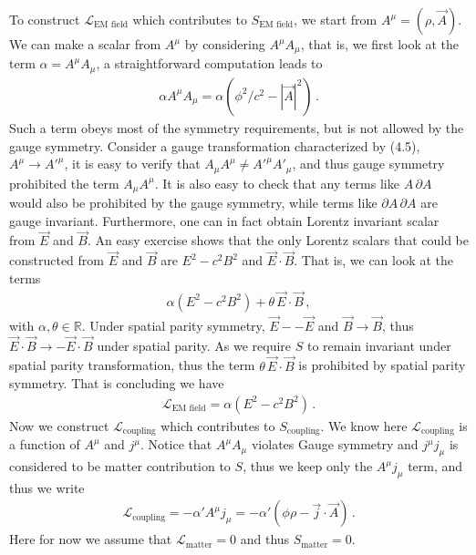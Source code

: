 \documentclass[11pt, onesided]{book}
\theoremstyle{break}
\theoremstyle{break}
\newcommand{\R}{\mathbb{R}}
\newcommand{\pd}{\partial}
\begin{document}
To construct $\mathcal{L}_{\text{EM field}}$ which contributes to $S_{\text{EM field}}$, we start from $A^\mu = (\rho, \vec{A})$. We can make a scalar from $A^\mu$ by considering $A^\mu A_\mu$, that is, we first look at the term $\alpha = A^\mu A_\mu$, a straightforward computation leads to
\begin{align*}
\alpha A^\mu A_\mu = \alpha\left( \phi^2 / c^2 - |\vec{A}|^2\right)\,.
\end{align*}
Such a term obeys most of the symmetry requirements, but is not allowed by the gauge symmetry. Consider a gauge transformation characterized by (4.5), $A^\mu \to {A'}^\mu$, it is easy to verify that $A_\mu A^\mu \neq {A'}^\mu {A'}_\mu$, and thus gauge symmetry prohibited the term $A_\mu A^\mu$. It is also easy to check that any terms like $A \, \pd A$ would also be prohibited by the gauge symmetry, while terms like $\pd A\, \pd A$ are gauge invariant. Furthermore, one can in fact obtain Lorentz invariant scalar from $\vec{E}$ and $\vec{B}$. An easy exercise shows that the only Lorentz scalars that could be constructed from $\vec{E}$ and $\vec{B}$ are $E^2 - c^2B^2$ and $\vec{E}\cdot \vec{B}$. That is, we can look at the terms 
\begin{align*}
\alpha(E^2 - c^2 B^2) + \theta \,\vec{E}\cdot \vec{B}\,,
\end{align*}
with $\alpha ,\theta \in \R$. Under spatial parity symmetry, $\vec{E} - -\vec{E}$ and $\vec{B} \to \vec{B}$, thus $\vec{E}\cdot \vec{B}\to -\vec{E}\cdot \vec{B}$ under spatial parity. As we require $S$ to remain invariant under spatial parity transformation, thus the term $\theta\, \vec{E}\cdot \vec{B}$ is prohibited by spatial parity symmetry. That is concluding we have
\begin{align*}
\mathcal{L}_{\text{EM field}} = \alpha(E^2 - c^2 B^2)\,.
\end{align*}
Now we construct $\mathcal{L}_{\text{coupling}}$ which contributes to $S_{\text{coupling}}$. We know here $\mathcal{L}_{\text{coupling}}$ is a function of $A^\mu$ and $j^\mu$. Notice that $A^\mu A_\mu$ violates Gauge symmetry and $j^\mu j_\mu$ is considered to be matter contribution to $S$, thus we keep only the $A^\mu j_\mu$ term, and thus we write
\begin{align*}
\mathcal{L}_{\text{coupling}} = -\alpha' A^\mu j_\mu = -\alpha'(\phi \rho - \vec{j}\cdot \vec{A})\,.
\end{align*} 
Here for now we assume that $\mathcal{L}_{\text{matter}} = 0$ and thus $S_{\text{matter} } = 0$. \\
\end{document}
